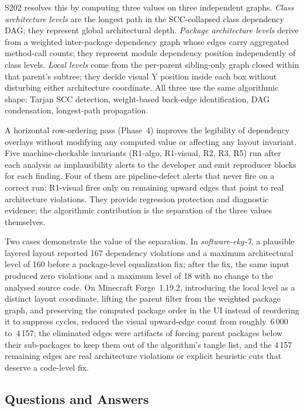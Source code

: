 \documentclass[a4paper,twoside]{article}
\begin{document}
S202 resolves this by computing three values on three independent
graphs. \emph{Class architecture levels} are the longest path in the
SCC-collapsed class dependency DAG; they represent global architectural depth.
\emph{Package architecture levels} derive from a weighted inter-package
dependency graph whose edges carry aggregated method-call counts; they
represent module dependency position independently of class levels.
\emph{Local levels} come from the per-parent
sibling-only graph closed within that parent's subtree; they decide visual Y
position inside each box without disturbing either architecture coordinate.
All three use the same algorithmic shape: Tarjan SCC detection, weight-based
back-edge identification, DAG condensation, longest-path propagation.

A horizontal row-ordering pass (Phase~4) improves the legibility of dependency
overlays without modifying any computed value or affecting any layout invariant.
Five machine-checkable invariants (R1-algo, R1-visual, R2, R3, R5) run after
each analysis as implausibility alerts to the developer and emit reproducer
blocks for each finding. Four of them are pipeline-defect alerts that never
fire on a correct run; R1-visual fires only on remaining upward edges that
point to real architecture violations. They provide regression protection and
diagnostic evidence; the algorithmic contribution is the separation of the
three values themselves.

Two cases demonstrate the value of the separation. In \emph{software-ekg-7},
a plausible layered layout reported 167 dependency violations and a maximum
architectural level of 160 before a package-level equalization fix; after the
fix, the same input produced zero violations and a maximum level of 18 with
no change to the analysed source code. On Minecraft Forge~1.19.2, introducing
the local level as a distinct layout coordinate, lifting the parent
filter from the weighted package graph, and preserving the computed package
order in the UI instead of reordering it to suppress cycles, reduced the
visual upward-edge count from roughly~6\,000 to~4\,157; the eliminated edges
were artifacts of forcing parent packages below their sub-packages to keep
them out of the algorithm's tangle list, and the 4\,157 remaining edges are
real architecture violations or explicit heuristic cuts that deserve a
code-level fix.

\subsection*{Questions and Answers}
\end{document}
